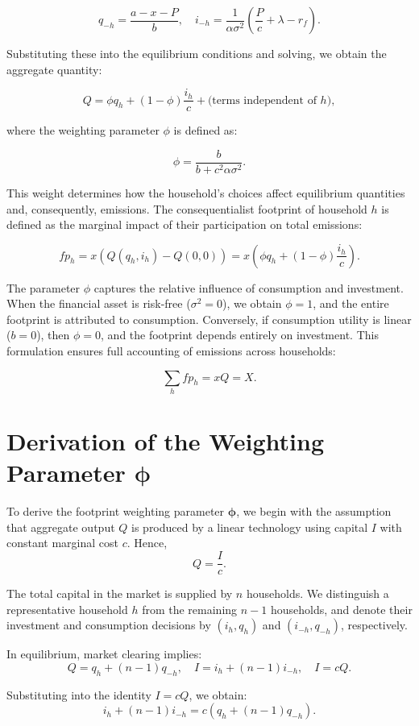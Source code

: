 \documentclass[12pt,a4paper]{article}
\begin{document}
\[
q_{-h} = \frac{a - x - P}{b}, \quad i_{-h} = \frac{1}{\alpha \sigma^2} \left( \frac{P}{c} + \lambda - r_f \right).
\]

Substituting these into the equilibrium conditions and solving, we obtain the aggregate quantity:

\[
Q = \phi q_h + (1 - \phi) \frac{i_h}{c} + \text{(terms independent of } h),
\]

where the weighting parameter $\phi$ is defined as:

\[
\phi = \frac{b}{b + c^2 \alpha \sigma^2}.
\]

This weight determines how the household’s choices affect equilibrium quantities and, consequently, emissions. The consequentialist footprint of household $h$ is defined as the marginal impact of their participation on total emissions:

\[
fp_h = x \left( Q(q_h, i_h) - Q(0, 0) \right) = x \left( \phi q_h + (1 - \phi) \frac{i_h}{c} \right).
\]


The parameter $\phi$ captures the relative influence of consumption and investment. When the financial asset is risk-free ($\sigma^2 = 0$), we obtain $\phi = 1$, and the entire footprint is attributed to consumption. Conversely, if consumption utility is linear ($b = 0$), then $\phi = 0$, and the footprint depends entirely on investment. This formulation ensures full accounting of emissions across households:

\[
\sum_h fp_h = xQ = X.
\]
\section{Derivation of the Weighting Parameter \( \boldsymbol{\phi} \)}

To derive the footprint weighting parameter \( \boldsymbol{\phi} \), we begin with the assumption that aggregate output \( Q \) is produced by a linear technology using capital \( I \) with constant marginal cost \( c \). Hence,
\[
Q = \frac{I}{c}.
\]

The total capital in the market is supplied by \( n \) households. We distinguish a representative household \( h \) from the remaining \( n - 1 \) households, and denote their investment and consumption decisions by \( (i_h, q_h) \) and \( (i_{-h}, q_{-h}) \), respectively.

In equilibrium, market clearing implies:
\[
Q = q_h + (n - 1) q_{-h}, \quad I = i_h + (n - 1) i_{-h}, \quad I = cQ.
\]

Substituting into the identity \( I = cQ \), we obtain:
\[
i_h + (n - 1) i_{-h} = c \left( q_h + (n - 1) q_{-h} \right).
\]
\end{document}
